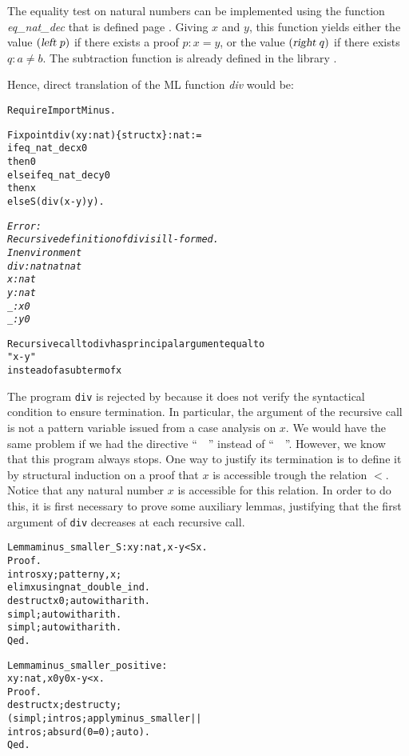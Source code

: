 \documentclass[11pt]{article}
\begin{document}
The equality test on natural numbers can be implemented using the
function \textsl{eq\_nat\_dec} that is defined page \pageref{iseqpage}. Giving $x$ and
$y$, this function yields either the value $(\textsl{left}\;p)$ if
there exists a proof $p:x=y$, or the value $(\textsl{right}\;q)$ if
there exists $q:a\not = b$. The subtraction function is already
defined in the library . 

Hence, direct translation of the ML function \textsl{div} would be:

\begin{alltt}
Require Import Minus.

Fixpoint div (x y:nat)\{struct x\}: nat :=
 if eq_nat_dec x 0 
  then 0
  else if eq_nat_dec y 0
       then x
       else S (div (x-y) y).

\it Error:
Recursive definition of div is ill-formed.
In environment
div : nat {\arrow} nat {\arrow} nat
x : nat
y : nat
_ : x {\coqdiff} 0
_ : y {\coqdiff} 0

Recursive call to div has principal argument equal to
"x - y"
instead of a subterm of x
\end{alltt}


The program \texttt{div} is rejected by {\coq} because it does not verify
the syntactical condition to ensure termination. In particular, the
argument of the recursive call is not a pattern variable issued from a
case analysis on $x$. 
We would have the same problem if we had the directive
``~~'' instead of ``~~''.
However, we know that this program always
stops. One way to justify its termination is to define it by
structural induction on a proof that $x$ is accessible trough the
relation $<$. Notice that any natural number $x$ is accessible
for this relation. In order to do this, it is first necessary to prove
some auxiliary lemmas, justifying that the first argument of
\texttt{div} decreases at each recursive call.

\begin{alltt}
Lemma minus_smaller_S : {\prodsym} x y:nat, x - y < S x.
Proof.
 intros x y; pattern y, x;
 elim x using nat_double_ind.
 destruct x0; auto with arith.
 simpl; auto with arith.
 simpl; auto with arith.
Qed.


Lemma minus_smaller_positive : 
 {\prodsym} x y:nat, x {\coqdiff}0 {\arrow} y {\coqdiff} 0 {\arrow}  x - y < x.
Proof.
 destruct x; destruct y; 
 ( simpl;intros; apply minus_smaller || 
   intros; absurd (0=0); auto).
Qed.
\end{alltt}
\end{document}
